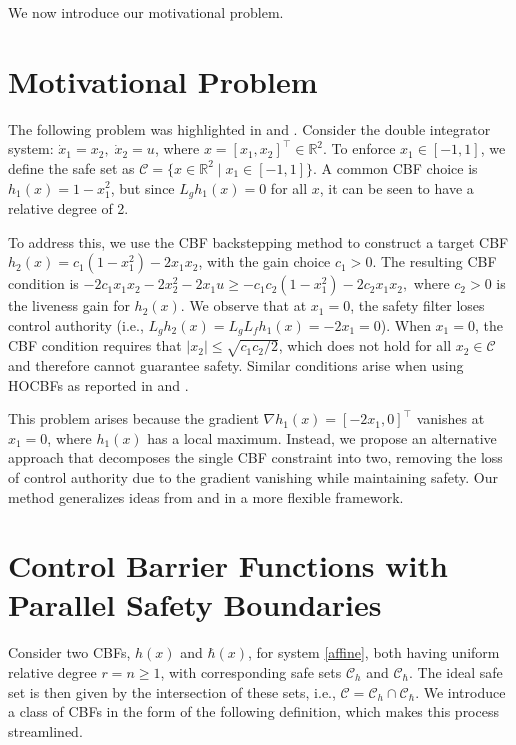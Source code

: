 \documentclass[letterpaper, 10 pt, conference]{ieeeconf}
\newcommand{\TODO}[1]{{\color{black}#1}}
\begin{document}
We now introduce our motivational problem.

\section{Motivational Problem}\label{motivation}
The following problem was highlighted in \cite{cohen_backstep_rom_2024} and \cite{ong_rectified_2024}. Consider the double integrator system: $\dot{x}_1 = x_2, \; \dot{x}_2 = u$, where ${x = [x_1, x_2]^\top \in \mathbb{R}^2}$. To enforce ${x_1 \in [-1,1]}$, we define the safe set as ${ \mathcal{C} = \{x \in \mathbb{R}^2 \mid x_1 \in [-1,1]\}}$. A common CBF choice is $h_1(x) = 1 - x_1^2$, but since $L_g h_1(x) = 0$ for all $x$, it can be seen to have a relative degree of 2. 

To address this, we use the CBF backstepping method to construct a target CBF ${h_2(x) = c_1(1 - x_1^2) - 2x_1x_2}$, with the gain choice \TODO{$c_1 > 0$. 
The resulting CBF condition is $-2c_1x_1x_2 -2x_2^2 -2x_1u \geq -c_1c_2(1 - x_1^2) -2c_2x_1x_2,$
where $c_2 > 0$ is the liveness gain for $h_2(x)$}.
We observe that at $x_1 = 0$, the safety filter loses control authority (i.e., $L_g h_2(x) = L_g L_f h_1(x) = -2x_1 = 0$). When $x_1 = 0$, the CBF condition requires that $|x_2| \leq \sqrt{c_1 c_2 / 2}$, which does not hold for all $x_2 \in \mathcal{C}$ and therefore cannot guarantee safety. Similar conditions arise when using HOCBFs as reported in \cite{cohen_backstep_rom_2024} and \cite{ong_rectified_2024}. 

This problem arises because the gradient $\nabla h_1(x) = [-2x_1, 0]^\top$ vanishes at $x_1 = 0$, where $h_1(x)$ has a local maximum. Instead, we propose an alternative approach that decomposes the single CBF constraint into two, removing the loss of control authority due to the gradient vanishing while maintaining safety. Our method generalizes ideas from \cite{drew_brugg_sim_LK} and \cite{koga_safe_2023} in a more flexible framework.

\section{Control Barrier Functions with Parallel Safety Boundaries}\label{parallel}
Consider two CBFs, $h(x)$ and $\hbar(x)$, for system \eqref{affine}, both having uniform relative degree $r = n \geq 1$, with corresponding safe sets $\mathcal{C}_h$ and $\mathcal{C}_\hbar$. The ideal safe set is then given by the intersection of these sets, i.e., $\mathcal{C} = \mathcal{C}_h \cap \mathcal{C}_{\hbar}$. We introduce a class of CBFs in the form of the following definition, which makes this process streamlined. 
\end{document}
